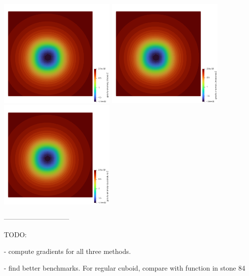 \begin{center}
\includegraphics[width=5.7cm]{python_codes/fieldstone_113/results/hex_test4/g_faces}
\includegraphics[width=5.7cm]{python_codes/fieldstone_113/results/hex_test4/g_mascons}
\includegraphics[width=5.7cm]{python_codes/fieldstone_113/results/hex_test4/g_quad}
\end{center}



 



-----------------------------

TODO:


- compute gradients for all three methods.

- find better benchmarks. For regular cuboid, compare with function in stone 84

